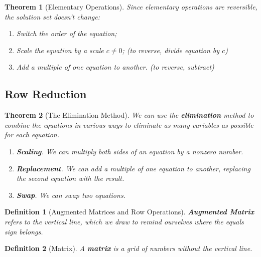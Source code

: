 \documentclass[12pt, a4paper]{article}
\newtheorem{thm}{Theorem}[subsection]
\newtheorem{df}{Definition}[subsection]
\begin{document}
\begin{thm}[Elementary Operations] Since elementary operations are reversible, the solution set doesn't change:
\begin{enumerate}
\item Switch the order of the equation;
\item Scale the equation by a scale $c\neq 0$; (to reverse, divide equation by $c$)
\item Add a multiple of one equation to another. (to reverse, subtract)
\end{enumerate}
\end{thm}

\subsection{Row Reduction}
\begin{thm}[The Elimination Method] We can use the \textbf{elimination} method to combine the equations in various ways to eliminate as many variables as possible for each equation.
\begin{enumerate}
\item \textbf{Scaling}. We can multiply both sides of an equation by a nonzero number. 
\item \textbf{Replacement}. We can add a multiple of one equation to another, replacing the second equation with the result. 
\item \textbf{Swap}. We can swap two equations.
\end{enumerate}
\end{thm}

\begin{df}[Augmented Matrices and Row Operations]
\textbf{Augmented Matrix} refers to the vertical line, which we draw to remind ourselves where the equals sign belongs.
\end{df}

\begin{df}[Matrix]
A \textbf{matrix} is a grid of numbers without the vertical line. 
\end{df}
\end{document}
